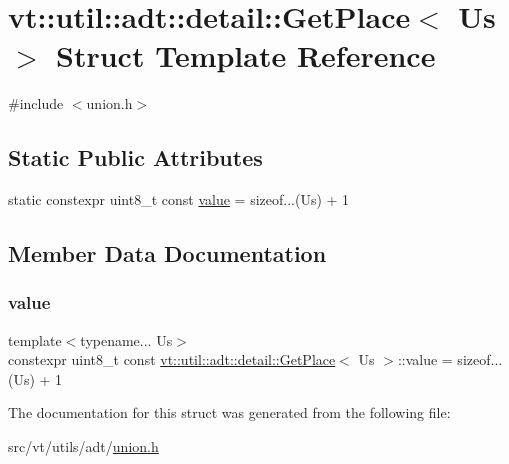 \hypertarget{structvt_1_1util_1_1adt_1_1detail_1_1_get_place}{}\section{vt\+:\+:util\+:\+:adt\+:\+:detail\+:\+:Get\+Place$<$ Us $>$ Struct Template Reference}
\label{structvt_1_1util_1_1adt_1_1detail_1_1_get_place}


{\ttfamily \#include $<$union.\+h$>$}

\subsection*{Static Public Attributes}
\begin{DoxyCompactItemize}
\item 
static constexpr uint8\+\_\+t const \hyperlink{structvt_1_1util_1_1adt_1_1detail_1_1_get_place_a70a9e14a6a2ae0dfd436992afa6a3ce9}{value} = sizeof...(Us) + 1
\end{DoxyCompactItemize}


\subsection{Member Data Documentation}
\mbox{\label{structvt_1_1util_1_1adt_1_1detail_1_1_get_place_a70a9e14a6a2ae0dfd436992afa6a3ce9}} 
\subsubsection{\texorpdfstring{value}{value}}
{\footnotesize\ttfamily template$<$typename... Us$>$ \\
constexpr uint8\+\_\+t const \hyperlink{structvt_1_1util_1_1adt_1_1detail_1_1_get_place}{vt\+::util\+::adt\+::detail\+::\+Get\+Place}$<$ Us $>$\+::value = sizeof...(Us) + 1\hspace{0.3cm}{\ttfamily [static]}}



The documentation for this struct was generated from the following file\+:\begin{DoxyCompactItemize}
\item 
src/vt/utils/adt/\hyperlink{union_8h}{union.\+h}\end{DoxyCompactItemize}
